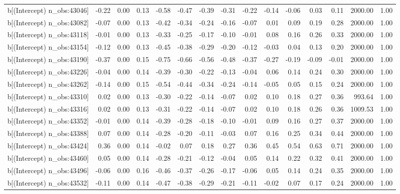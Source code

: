 \begin{table}[ht]
\begin{tabular}{rrrrrrrrrrrrrrr}
  b[(Intercept) n\_obs:43046] & -0.22 & 0.00 & 0.13 & -0.58 & -0.47 & -0.39 & -0.31 & -0.22 & -0.14 & -0.06 & 0.03 & 0.11 & 2000.00 & 1.00 \\ 
  b[(Intercept) n\_obs:43082] & -0.07 & 0.00 & 0.13 & -0.42 & -0.34 & -0.24 & -0.16 & -0.07 & 0.01 & 0.09 & 0.19 & 0.28 & 2000.00 & 1.00 \\ 
  b[(Intercept) n\_obs:43118] & -0.01 & 0.00 & 0.13 & -0.33 & -0.25 & -0.17 & -0.10 & -0.01 & 0.08 & 0.16 & 0.26 & 0.33 & 2000.00 & 1.00 \\ 
  b[(Intercept) n\_obs:43154] & -0.12 & 0.00 & 0.13 & -0.45 & -0.38 & -0.29 & -0.20 & -0.12 & -0.03 & 0.04 & 0.13 & 0.20 & 2000.00 & 1.00 \\ 
  b[(Intercept) n\_obs:43190] & -0.37 & 0.00 & 0.15 & -0.75 & -0.66 & -0.56 & -0.48 & -0.37 & -0.27 & -0.19 & -0.09 & -0.01 & 2000.00 & 1.00 \\ 
  b[(Intercept) n\_obs:43226] & -0.04 & 0.00 & 0.14 & -0.39 & -0.30 & -0.22 & -0.13 & -0.04 & 0.06 & 0.14 & 0.24 & 0.30 & 2000.00 & 1.00 \\ 
  b[(Intercept) n\_obs:43262] & -0.14 & 0.00 & 0.15 & -0.54 & -0.44 & -0.34 & -0.24 & -0.14 & -0.05 & 0.05 & 0.15 & 0.24 & 2000.00 & 1.00 \\ 
  b[(Intercept) n\_obs:43310] & 0.02 & 0.00 & 0.13 & -0.30 & -0.22 & -0.14 & -0.07 & 0.02 & 0.10 & 0.18 & 0.27 & 0.36 & 993.64 & 1.00 \\ 
  b[(Intercept) n\_obs:43316] & 0.02 & 0.00 & 0.13 & -0.31 & -0.22 & -0.14 & -0.07 & 0.02 & 0.10 & 0.18 & 0.26 & 0.36 & 1009.53 & 1.00 \\ 
  b[(Intercept) n\_obs:43352] & -0.01 & 0.00 & 0.14 & -0.39 & -0.28 & -0.18 & -0.10 & -0.01 & 0.09 & 0.16 & 0.27 & 0.37 & 2000.00 & 1.00 \\ 
  b[(Intercept) n\_obs:43388] & 0.07 & 0.00 & 0.14 & -0.28 & -0.20 & -0.11 & -0.03 & 0.07 & 0.16 & 0.25 & 0.34 & 0.44 & 2000.00 & 1.00 \\ 
  b[(Intercept) n\_obs:43424] & 0.36 & 0.00 & 0.14 & -0.02 & 0.07 & 0.18 & 0.27 & 0.36 & 0.45 & 0.54 & 0.63 & 0.71 & 2000.00 & 1.00 \\ 
  b[(Intercept) n\_obs:43460] & 0.05 & 0.00 & 0.14 & -0.28 & -0.21 & -0.12 & -0.04 & 0.05 & 0.14 & 0.22 & 0.32 & 0.41 & 2000.00 & 1.00 \\ 
  b[(Intercept) n\_obs:43496] & -0.06 & 0.00 & 0.16 & -0.46 & -0.37 & -0.26 & -0.17 & -0.06 & 0.05 & 0.14 & 0.24 & 0.35 & 2000.00 & 1.00 \\ 
  b[(Intercept) n\_obs:43532] & -0.11 & 0.00 & 0.14 & -0.47 & -0.38 & -0.29 & -0.21 & -0.11 & -0.02 & 0.07 & 0.17 & 0.24 & 2000.00 & 1.00 \\ 

\end{tabular}
\end{table}
